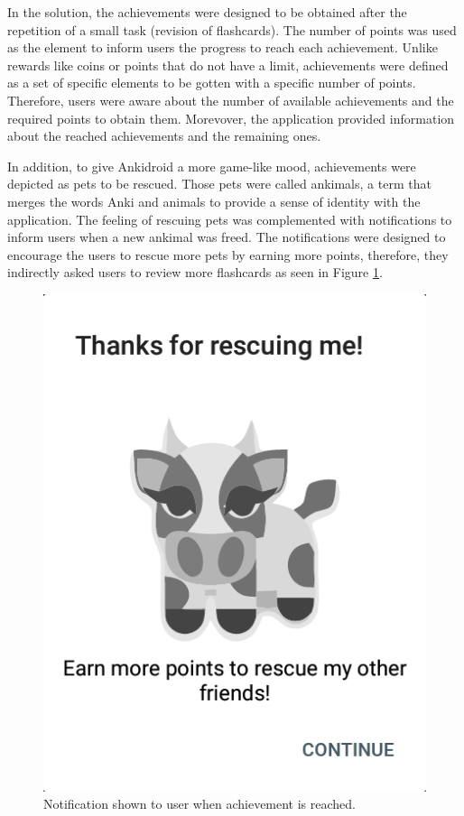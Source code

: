 In the solution, the achievements were designed to be obtained after the repetition of a small task (revision of flashcards). The number of points was used as the element to inform users the progress to reach each achievement. Unlike rewards like coins or points that do not have a limit, achievements were defined as a set of specific elements to be gotten with a specific number of points. Therefore, users were aware about the number of available achievements and the required points to obtain them. Morevover, the application provided information about the reached achievements and the remaining ones.

In addition, to give Ankidroid a more game-like mood, achievements were depicted as pets to be rescued. Those pets were called ankimals, a term that merges the words Anki and animals to provide a sense of identity with the application. The feeling of rescuing pets was complemented with notifications to inform users when a new ankimal was freed. The notifications were designed to encourage the users to rescue more pets by earning more points, therefore, they indirectly asked users to review more flashcards as seen in Figure \ref{fig:ankimals-rescue}.

\begin{figure}[htb]
    \vskip 5mm
        \begin{center}
            \includegraphics[scale=0.5]{./Figures/achievement_notification.png}
            \caption{Notification shown to user when achievement is reached.}
            \label{fig:ankimals-rescue}
        \end{center}
    \vskip -5mm
\end{figure}

